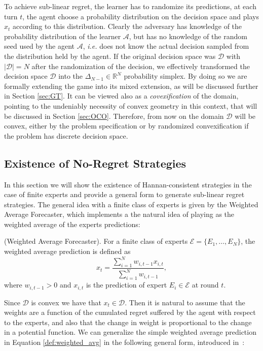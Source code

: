 To achieve sub-linear regret, the learner has to randomize its predictions, at each turn $t$, the agent choose a probability distribution on the decision space and plays $x_t$ according to this distribution. Clearly the adversary has knowledge of the probability distribution of the learner $\mathcal A$, but has no knowledge of the random seed used by the agent $\mathcal A$, \emph{i.e.} does not know the actual decision sampled from the distribution held by the agent. If the original decision space was $\mathcal D$ with $|\mathcal D|=N$ after the randomization of the decision, we effectively transformed the decision space $\mathcal D$ into the $\Delta_{N-1}\in\mathbb R^{N}$ probability simplex. By doing so we are formally extending the game into its mixed extension, as will be discussed further in Section \ref{sec:GT}. It can be viewed also as a \emph{covexification} of the domain, pointing to the undeniably necessity of convex geometry in this context, that will be discussed in Section \ref{sec:OCO}. Therefore, from now on the domain $\mathcal D$ will be convex, either by the problem specification or by randomized convexification if the problem has discrete decision space.

\subsection{Existence of No-Regret Strategies}\label{sec:existence_of_no_regret}
In this section we will show the existence of Hannan-consistent strategies in the case of finite experts and provide a general form to generate sub-linear regret strategies. 
The general idea with a finite class of experts is given by the Weighted Average Forecaster, which implements a the natural idea of playing as the weighted average of the experts predictions:

\begin{definition}(Weighted Average Forecaster).\label{def:weighted_avg}
For a finite class of experts $\mathcal E=\{E_1,\ldots,E_N\}$, the weighted average prediction is defined as
\begin{equation}
	x_t = \frac{\sum\limits_{i=1}^{N}w_{i,t-1}x_{i,t}}{\sum\limits_{i=1}^{N}w_{i,t-1}},
\end{equation}
where $w_{i,t-1}>0$ and $x_{i,t}$ is the prediction of expert $E_i\in\mathcal E$ at round $t$. 
\end{definition}

Since $\mathcal D$ is convex we have that $x_t\in\mathcal D$.
Then it is natural to assume that the weights are a function of the cumulated regret suffered by the agent with respect to the experts, and also that the change in weight is proportional to the change in a potential function.
We can generalize the simple weighted average prediction in Equation \eqref{def:weighted_avg} in the following general form, introduced in~\cite{cesa2003potential}:

